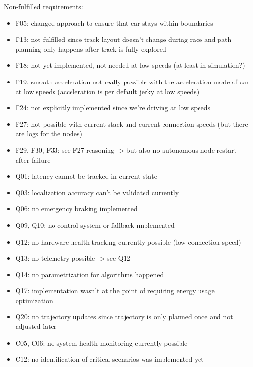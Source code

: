 Non-fulfilled requirements:
\begin{itemize}
	\item F05: changed approach to ensure that car stays within boundaries
	\item F13: not fulfilled since track layout doesn't change during race and path planning only happens after track is fully explored
	\item F18: not yet implemented, not needed at low speeds (at least in simulation?)
	\item F19: smooth acceleration not really possible with the acceleration mode of car at low speeds (acceleration is per default jerky at low speeds)
	\item F24: not explicitly implemented since we're driving at low speeds
	\item F27: not possible with current stack and current connection speeds (but there are logs for the nodes)
	\item F29, F30, F33: see F27 reasoning -> but also no autonomous node restart after failure
	\item Q01: latency cannot be tracked in current state
	\item Q03: localization accuracy can't be validated currently
	\item Q06: no emergency braking implemented
	\item Q09, Q10: no control system or fallback implemented
	\item Q12: no hardware health tracking currently possible (low connection speed)
	\item Q13: no telemetry possible -> see Q12
	\item Q14: no parametrization for algorithms happened
	\item Q17: implementation wasn't at the point of requiring energy usage optimization
	\item Q20: no trajectory updates since trajectory is only planned once and not adjusted later
	\item C05, C06: no system health monitoring currently possible
	\item C12: no identification of critical scenarios was implemented yet
\end{itemize}